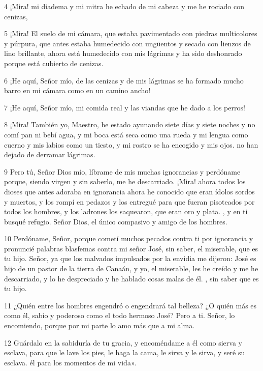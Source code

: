 \par 4 ¡Mira! mi diadema y mi mitra he echado de mi cabeza y me he rociado con cenizas,

\par 5 ¡Mira! El suelo de mi cámara, que estaba pavimentado con piedras multicolores y púrpura, que antes estaba humedecido con ungüentos y secado con lienzos de lino brillante, ahora está humedecido con mis lágrimas y ha sido deshonrado porque está cubierto de cenizas.

\par 6 ¡He aquí, Señor mío, de las cenizas y de mis lágrimas se ha formado mucho barro en mi cámara como en un camino ancho!

\par 7 ¡He aquí, Señor mío, mi comida real y las viandas que he dado a los perros!

\par 8 ¡Mira! También yo, Maestro, he estado ayunando siete días y siete noches y no comí pan ni bebí agua, y mi boca está seca como una rueda y mi lengua como cuerno y mis labios como un tiesto, y mi rostro se ha encogido y mis ojos. no han dejado de derramar lágrimas.

\par 9 Pero tú, Señor Dios mío, líbrame de mis muchas ignorancias y perdóname porque, siendo virgen y sin saberlo, me he descarriado. ¡Mira! ahora todos los dioses que antes adoraba en ignorancia ahora he conocido que eran ídolos sordos y muertos, y los rompí en pedazos y los entregué para que fueran pisoteados por todos los hombres, y los ladrones los saquearon, que eran oro y plata. , y en ti busqué refugio. Señor Dios, el único compasivo y amigo de los hombres.

\par 10 Perdóname, Señor, porque cometí muchos pecados contra ti por ignorancia y pronuncié palabras blasfemas contra mi señor José, sin saber, el miserable, que es tu hijo. Señor, ya que los malvados impulsados ​​por la envidia me dijeron: José es hijo de un pastor de la tierra de Canaán, y yo, el miserable, les he creído y me he descarriado, y lo he despreciado y he hablado cosas malas de él. , sin saber que es tu hijo.

\par 11 ¿Quién entre los hombres engendró o engendrará tal belleza? ¿O quién más es como él, sabio y poderoso como el todo hermoso José? Pero a ti. Señor, lo encomiendo, porque por mi parte lo amo más que a mi alma.

\par 12 Guárdalo en la sabiduría de tu gracia, y encoméndame a él como sierva y esclava, para que le lave los pies, le haga la cama, le sirva y le sirva, y seré su esclava. él para los momentos de mi vida».

